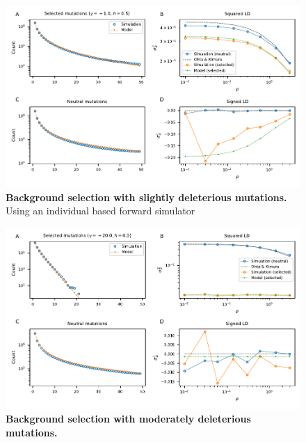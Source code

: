 \documentclass[]{article}
\begin{document}
\begin{figure}[ht!]
    \centering
    \includegraphics{../figures/bgs_gamma_-1.0_h_0.5_n_50}
    \caption{
        \textbf{Background selection with slightly deleterious mutations.}
        Using an individual based forward simulator
    }
    \label{fig:bgs1}
\end{figure}

\begin{figure}[ht!]
    \centering
    \includegraphics{../figures/bgs_gamma_-20.0_h_0.5_n_50}
    \caption{
        \textbf{Background selection with moderately deleterious mutations.}
    }
    \label{fig:bgs2}
\end{figure}
\end{document}
